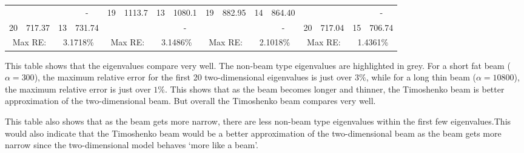 \documentclass[../../main.tex]{subfiles}
\begin{document}
\begin{table}[h!]
{{\begin{tabular}{|cccc||cccc||cccc||cccc|}
		\cellcolor{lightgray}{19} & \cellcolor{lightgray}{657.87} &       & {-} & 19    & 1113.7 & 13    & 1080.1 & 19    & 882.95 & 14    & 864.40 & \cellcolor{lightgray}{19}    & \cellcolor{lightgray}{623.05} &       & {-} \\
		{20} & 717.37 & 13    & 731.74 & \cellcolor{lightgray}{20}    & \cellcolor{lightgray}{1218.0}  &       & {-} & \cellcolor{lightgray}{20}    & \cellcolor{lightgray}{927.18} &       & {-} & 20    & 717.04 & 15    & 706.74 \\
		\hline
		\multicolumn{2}{|c}{Max RE:} & \multicolumn{2}{c||}{3.1718\%} & \multicolumn{2}{c}{Max RE:} & \multicolumn{2}{c||}{3.1486\%} & \multicolumn{2}{c}{Max RE:} & \multicolumn{2}{c||}{2.1018\%} & \multicolumn{2}{c}{Max RE:} & \multicolumn{2}{c|}{1.4361\%} \\
		\hline
	\end{tabular}%
	\label{tab:Timo}%
}
}
\end{table}%
\FloatBarrier

This table shows that the eigenvalues compare very well. The non-beam type eigenvalues are highlighted in grey. For a short fat beam ($\alpha = 300$), the maximum relative error for the first 20 two-dimensional eigenvalues is just over $3\%$, while for a long thin beam ($\alpha = 10800$), the maximum relative error is just over $1\%$. This shows that as the beam becomes longer and thinner, the Timoshenko beam is better approximation of the two-dimensional beam. But overall the Timoshenko beam compares very well.

This table also shows that as the beam gets more narrow, there are less non-beam type eigenvalues within the first few eigenvalues.This would also indicate that the Timoshenko beam would be a better approximation of the two-dimensional beam as the beam gets more narrow since the two-dimensional model behaves `more like a beam'.
\end{document}

